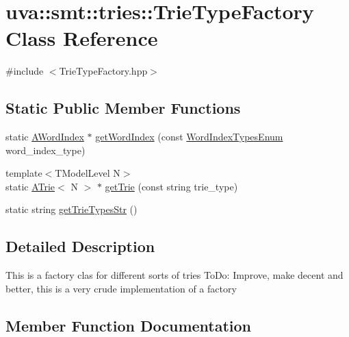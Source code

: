 \hypertarget{classuva_1_1smt_1_1tries_1_1_trie_type_factory}{}\section{uva\+:\+:smt\+:\+:tries\+:\+:Trie\+Type\+Factory Class Reference}
\label{classuva_1_1smt_1_1tries_1_1_trie_type_factory}


{\ttfamily \#include $<$Trie\+Type\+Factory.\+hpp$>$}

\subsection*{Static Public Member Functions}
\begin{DoxyCompactItemize}
\item 
static \hyperlink{classuva_1_1smt_1_1tries_1_1dictionary_1_1_a_word_index}{A\+Word\+Index} $\ast$ \hyperlink{classuva_1_1smt_1_1tries_1_1_trie_type_factory_a3b993c709930f423ebfa69e0bd372495}{get\+Word\+Index} (const \hyperlink{namespaceuva_1_1smt_1_1tries_1_1dictionary_a2d9d8547b613df614eb53c510c5223af}{Word\+Index\+Types\+Enum} word\+\_\+index\+\_\+type)
\item 
{\footnotesize template$<$T\+Model\+Level N$>$ }\\static \hyperlink{classuva_1_1smt_1_1tries_1_1_a_trie}{A\+Trie}$<$ N $>$ $\ast$ \hyperlink{classuva_1_1smt_1_1tries_1_1_trie_type_factory_ad885913e701fbf73708c8d5b74fbbae0}{get\+Trie} (const string trie\+\_\+type)
\item 
static string \hyperlink{classuva_1_1smt_1_1tries_1_1_trie_type_factory_a41fe3a4c7023bfa3b5a5d329b787ccb5}{get\+Trie\+Types\+Str} ()
\end{DoxyCompactItemize}


\subsection{Detailed Description}
This is a factory clas for different sorts of tries To\+Do\+: Improve, make decent and better, this is a very crude implementation of a factory 

\subsection{Member Function Documentation}
\hypertarget{classuva_1_1smt_1_1tries_1_1_trie_type_factory_ad885913e701fbf73708c8d5b74fbbae0}{}
